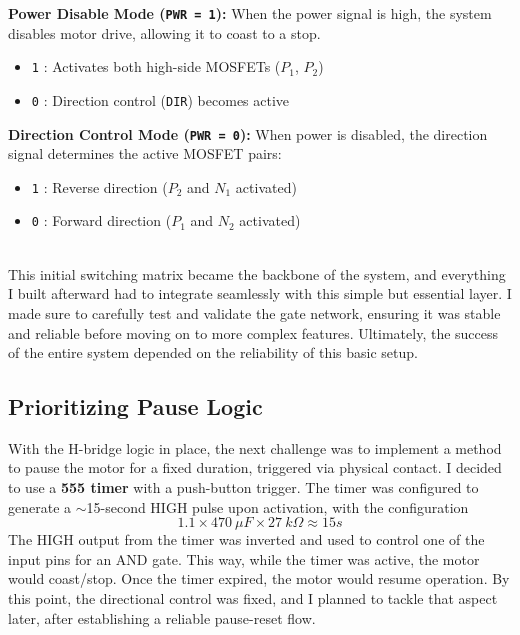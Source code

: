 \documentclass{article}
\newcommand{\code}[1]{\colorbox{light-gray}{\texttt{#1}}}
\begin{document}
\hspace*{-1em}
\begin{minipage}{0.53\textwidth}
	\textbf{Power Disable Mode (\texttt{PWR = 1}):} 
	When the power signal is high, the system disables motor drive, allowing it to coast to a stop.
	\begin{itemize}[itemsep=-1mm]
		\item \code{1} : Activates both high-side MOSFETs ($P_1$, $P_2$)
		\item \code{0} : Direction control (\texttt{DIR}) becomes active
	\end{itemize}	
\end{minipage}\hspace{1em}
\begin{minipage}{0.5\textwidth}
	\textbf{Direction Control Mode (\texttt{PWR = 0}):} 
	When power is disabled, the direction signal determines the active MOSFET pairs:
	\begin{itemize}[itemsep=-1mm]
		\item \code{1} : Reverse direction ($P_2$ and $N_1$ activated)
		\item \code{0} : Forward direction ($P_1$ and $N_2$ activated)
	\end{itemize}
\end{minipage}\\[5pt]
This initial switching matrix became the backbone of the system, and everything I built afterward had to integrate seamlessly with this simple but essential layer. I made sure to carefully test and validate the gate network, ensuring it was stable and reliable before moving on to more complex features. Ultimately, the success of the entire system depended on the reliability of this basic setup.
\vspace{-0.4em}
\subsection{Prioritizing Pause Logic}
With the H-bridge logic in place, the next challenge was to implement a method to {pause the motor} for a fixed duration, triggered via physical contact. I decided to use a \textbf{555 timer} with a push-button trigger. The timer was configured to generate a $\sim$15-second HIGH pulse upon activation, with the configuration $$1.1 \times 470\ \mu{F} \times 27\ {k}\Omega\approx 15s$$
The HIGH output from the timer was {inverted} and used to control one of the input pins for an AND gate. This way, while the timer was active, the motor would {coast/stop}. Once the timer expired, the motor would resume operation. By this point, the directional control was fixed, and I planned to tackle that aspect later, after establishing a reliable pause-reset flow.
\end{document}
